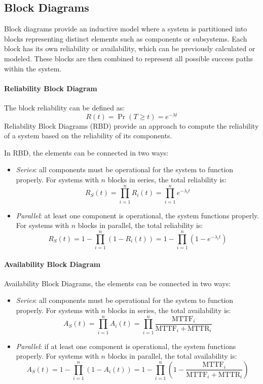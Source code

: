 \subsection{Block Diagrams}
Block diagrams provide an inductive model where a system is partitioned into blocks representing distinct elements such as components or subsystems. 
Each block has its own reliability or availability, which can be previously calculated or modeled. 
These blocks are then combined to represent all possible success paths within the system.

\paragraph*{Reliability Block Diagram}
The block reliability can be defined as:
\[R(t)=\Pr(T \geq t)=e^{-\lambda t}\]
Reliability Block Diagrams (RBD) provide an approach to compute the reliability of a system based on the reliability of its components.

In RBD, the elements can be connected in two ways:
\begin{itemize}
    \item \textit{Series}: all components must be operational for the system to function properly. 
        For systems with $n$ blocks in series, the total reliability is:
        \[R_S(t)=\prod_{i=1}^{n}R_i(t)=\prod_{i=1}^{n}e^{-\lambda_i t}\]
    \item \textit{Parallel}:  at least one component is operational, the system functions properly. 
        For systems with $n$ blocks in parallel, the total reliability is:
        \[R_S(t)=1-\prod_{i=1}^{n}\left(1-R_i(t)\right)=1-\prod_{i=1}^{n}\left(1-e^{-\lambda_i t}\right)\]
\end{itemize}

\paragraph*{Availability Block Diagram}
Availability Block Diagrams, the elements can be connected in two ways:
\begin{itemize}
    \item \textit{Series}: all components must be operational for the system to function properly. 
        For systems with $n$ blocks in series, the total availability is:
        \[A_S(t)=\prod_{i=1}^{n}A_i(t)=\prod_{i=1}^{n}\dfrac{\text{MTTF}_i}{\text{MTTF}_i+\text{MTTR}_i}\]
    \item \textit{Parallel}: if at least one component is operational, the system functions properly. 
        For systems with $n$ blocks in parallel, the total availability is:
        \[A_S(t)=1-\prod_{i=1}^{n}\left(1-A_i(t)\right)=1-\prod_{i=1}^{n}\left(1-\dfrac{\text{MTTF}_i}{\text{MTTF}_i+\text{MTTR}_i}\right)\]
\end{itemize}


